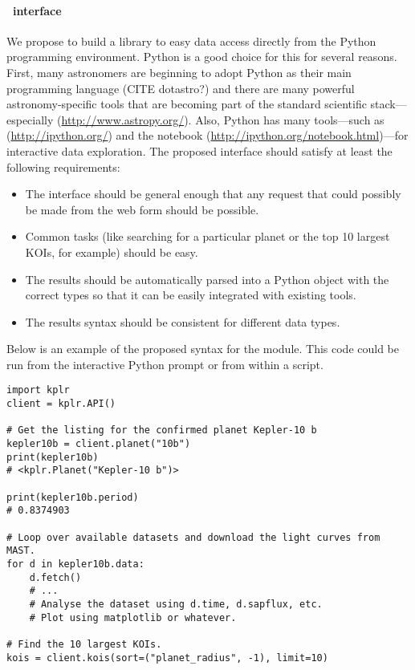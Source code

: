 \documentclass[letterpaper,12pt,preprint]{hack_aastex}
\newcommand{\kplr}{\package{kplr}}
\begin{document}
\paragraph{\kplr\ interface}
We propose to build a library to easy data access directly from the Python
programming environment.
Python is a good choice for this for several reasons.
First, many astronomers are beginning to adopt Python as their main
programming language (CITE dotastro?) and there are many powerful
astronomy-specific tools that are becoming part of the standard scientific
stack---especially  (\url{http://www.astropy.org/}).
Also, Python has many tools---such as 
 (\url{http://ipython.org/}) and the  notebook
 (\url{http://ipython.org/notebook.html})---for interactive data exploration.
The proposed interface should satisfy at least the following requirements:
\begin{itemize}
\item The interface should be general enough that any request that could
possibly be made from the web form should be possible.
\item Common tasks (like searching for a particular planet or the top 10
largest KOIs, for example) should be easy.
\item The results should be automatically parsed into a Python object with the
correct types so that it can be easily integrated with existing tools.
\item The results syntax should be consistent for different data types.
\end{itemize}
Below is an example of the proposed syntax for the module.
This code could be run from the interactive Python prompt or from within a
script.

\begin{lstlisting}
import kplr
client = kplr.API()

# Get the listing for the confirmed planet Kepler-10 b
kepler10b = client.planet("10b")
print(kepler10b)
# <kplr.Planet("Kepler-10 b")>

print(kepler10b.period)
# 0.8374903

# Loop over available datasets and download the light curves from MAST.
for d in kepler10b.data:
    d.fetch()
    # ...
    # Analyse the dataset using d.time, d.sapflux, etc.
    # Plot using matplotlib or whatever.

# Find the 10 largest KOIs.
kois = client.kois(sort=("planet_radius", -1), limit=10)
\end{lstlisting}
\end{document}
